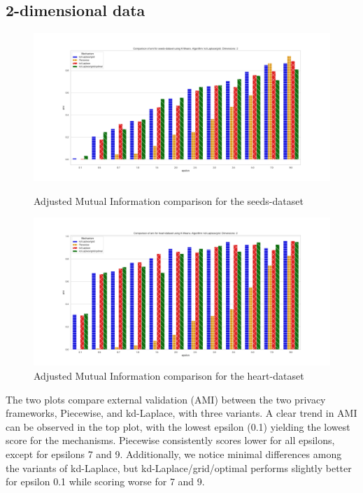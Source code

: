 \subsection{2-dimensional data}
\begin{figure}[H]
    \centering
    \begin{minipage}[c]{0.8\textwidth}
        \includegraphics[width=1\textwidth]{Results/RQ1/seeds-dataset/ami_seeds-dataset_comparison.png}
        \caption{Adjusted Mutual Information comparison for the seeds-dataset}
        \label{fig:ami_seeds-dataset_comparison_2d}
    \end{minipage}
    \begin{minipage}[c]{0.8\textwidth}
        \includegraphics[width=1\textwidth]{Results/RQ1/heart-dataset/ami_heart-dataset_comparison.png}
        \caption{Adjusted Mutual Information comparison for the heart-dataset}
        \label{fig:ami_heart-dataset_comparison_2d}
    \end{minipage}

\end{figure}
The two plots compare external validation (AMI) between the two privacy frameworks, Piecewise, and kd-Laplace, with three variants. A clear trend in AMI can be observed in the top plot, with the lowest epsilon (0.1) yielding the lowest score for the mechanisms. Piecewise consistently scores lower for all epsilons, except for epsilons 7 and 9. Additionally, we notice minimal differences among the variants of kd-Laplace, but kd-Laplace/grid/optimal performs slightly better for epsilon 0.1 while scoring worse for 7 and 9.


